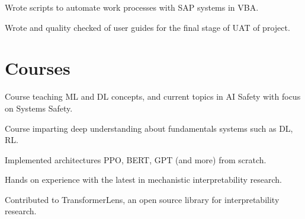 \documentclass[]{deedy-resume-openfont}
\begin{document}
\begin{minipage}[t]{0.66\textwidth}
\begin{tightemize}
\item Wrote scripts to automate work processes with SAP systems in VBA.
\item Wrote and quality checked of user guides for the final stage of UAT of project.
\end{tightemize}
\sectionsep


\section{Courses}
\begin{tightemize}
\item Course teaching ML and DL concepts, and current topics in AI Safety with focus on Systems Safety.
\end{tightemize}
\sectionsep

\begin{tightemize}
\item Course imparting deep understanding about fundamentals systems such as DL, RL.
\item Implemented architectures PPO, BERT, GPT (and more) from scratch.
\item Hands on experience with the latest in mechanistic interpretability research.
\item Contributed to TransformerLens, an open source library for interpretability research.
\end{tightemize}
\sectionsep

\end{minipage}
\end{document}
